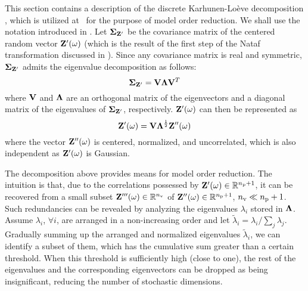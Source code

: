 This section contains a description of the discrete Karhunen-Lo\`{e}ve decomposition \cite{ghanem1991}, which is utilized at \ for the purpose of model order reduction.
We shall use the notation introduced in .
Let $\mCov_{\vZ'}$ be the covariance matrix of the centered random vector $\mathbf{Z}'(\omega)$ (which is the result of the first step of the Nataf transformation discussed in ).
  Since any covariance matrix is real and symmetric, $\mCov_{\vZ'}$ admits the eigenvalue decomposition \cite{press2007} as follows:
\[
  \mCov_{\vZ'} = \m{V} \m{\Lambda} \m{V}^T
\]
where $\m{V}$ and $\m{\Lambda}$ are an orthogonal matrix of the eigenvectors and a diagonal matrix of the eigenvalues of $\mCov_{\vZ'}$, respectively.
$\mathbf{Z}'(\omega)$ can then be represented as
\[
  \vZ'(\o) = \m{V} \m{\Lambda}^\frac{1}{2} \vZ''(\o)
\]
where the vector $\mathbf{Z}''(\omega)$ is centered, normalized, and uncorrelated, which is also independent as $\mathbf{Z}'(\omega)$ is Gaussian.

The decomposition above provides means for model order reduction.
The intuition is that, due to the correlations possessed by $\mathbf{Z}'(\omega) \in \mathbb{R}^{{n_\text{p}} + 1}$, it can be recovered from a small subset $\mathbf{Z}'''(\omega) \in \mathbb{R}^{n_\text{v}}$ of $\mathbf{Z}''(\omega) \in \mathbb{R}^{{n_\text{p}} + 1}$, ${n_\text{v}} \ll {n_\text{p}} + 1$.
Such redundancies can be revealed by analyzing the eigenvalues $\lambda_i$ stored in $\m{\Lambda}$.
Assume $\lambda_i$, $\forall i$, are arranged in a non-increasing order and let $\tilde{\lambda}_i = \lambda_i / \sum_j \lambda_j$.
Gradually summing up the arranged and normalized eigenvalues $\tilde{\lambda}_i$, we can identify a subset of them, which has the cumulative sum greater than a certain threshold.
When this threshold is sufficiently high (close to one), the rest of the eigenvalues and the corresponding eigenvectors can be dropped as being insignificant, reducing the number of stochastic dimensions.
